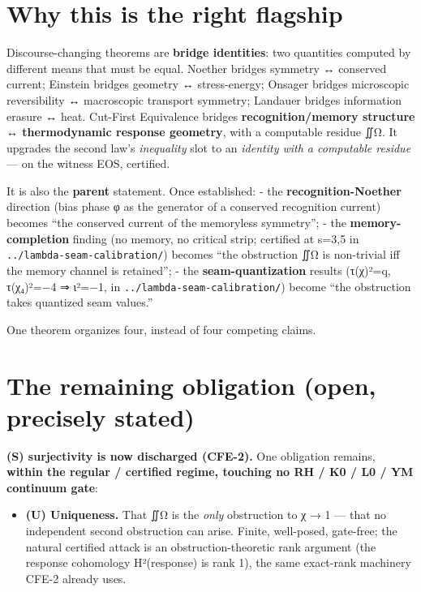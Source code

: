 \hypertarget{why-this-is-the-right-flagship}{%
\section{Why this is the right flagship}\label{why-this-is-the-right-flagship}}

Discourse-changing theorems are \textbf{bridge identities}: two quantities
computed by different means that must be equal. Noether bridges symmetry
↔ conserved current; Einstein bridges geometry ↔ stress-energy; Onsager
bridges microscopic reversibility ↔ macroscopic transport symmetry;
Landauer bridges information erasure ↔ heat. Cut-First Equivalence
bridges \textbf{recognition/memory structure ↔ thermodynamic response
geometry}, with a computable residue ∬Ω. It upgrades the second law's
\emph{inequality} slot to an \emph{identity with a computable residue} --- on the
witness EOS, certified.

It is also the \textbf{parent} statement. Once established:
- the \textbf{recognition-Noether} direction (bias phase φ as the generator
of a conserved recognition current) becomes ``the conserved current of
the memoryless symmetry'';
- the \textbf{memory-completion} finding (no memory, no critical strip;
certified at s=3,5 in \texttt{../lambda-seam-calibration/}) becomes ``the
obstruction ∬Ω is non-trivial iff the memory channel is retained'';
- the \textbf{seam-quantization} results (\textbar τ(χ)\textbar²=q, τ(χ₄)²=−4 ⇒ ι²=−1, in
\texttt{../lambda-seam-calibration/}) become ``the obstruction takes quantized
seam values.''

One theorem organizes four, instead of four competing claims.

\hypertarget{the-remaining-obligation-open-precisely-stated}{%
\section{The remaining obligation (open, precisely stated)}\label{the-remaining-obligation-open-precisely-stated}}

\textbf{(S) surjectivity is now discharged (CFE-2).} One obligation remains,
\textbf{within the regular / certified regime, touching no RH / K0 / L0 / YM
continuum gate}:

\begin{itemize}
\tightlist
\item
  \textbf{(U) Uniqueness.} That ∬Ω is the \emph{only} obstruction to χ → 1 --- that
  no independent second obstruction can arise. Finite, well-posed,
  gate-free; the natural certified attack is an obstruction-theoretic
  rank argument (the response cohomology H²(response) is rank 1), the
  same exact-rank machinery CFE-2 already uses.
\end{itemize}

